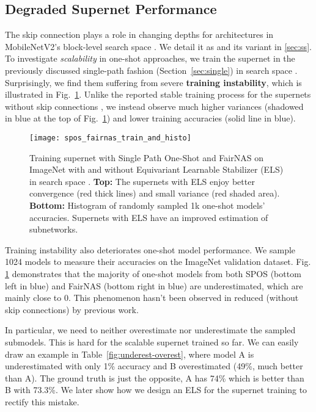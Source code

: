\documentclass[runningheads]{llncs}
\begin{document}
\subsection{Degraded Supernet Performance}


The skip connection plays a role in changing depths for architectures in MobileNetV2's block-level search space  \cite{cai2018proxylessnas,wu2018fbnet}. We detail it as  and its variant   in \ref{sec:ss}. To investigate \emph{scalability} in one-shot approaches, we train the supernet in the previously discussed single-path fashion (Section~\ref{sec:single}) in search space . Surprisingly, we find them suffering from severe \textbf{training instability}, which is illustrated in Fig.~\ref{fig:spos_fairnas_train_and_histo}. Unlike the reported stable training process for the supernets without skip connections \cite{guo2019single,chu2019fairnas}, we instead observe much higher variances (shadowed in blue at the top of Fig.~\ref{fig:spos_fairnas_train_and_histo}) and lower training accuracies (solid line in blue).  

\begin{figure}[ht]
	\centering
	\texttt{[image: spos\_fairnas\_train\_and\_histo]}
	\caption{Training supernet with Single Path One-Shot \protect\cite{guo2019single} and FairNAS \protect\cite{chu2019fairnas} on ImageNet with and without Equivariant Learnable Stabilizer (ELS) in search space . \textbf{Top:} The supernets with ELS enjoy better convergence (red thick lines) and small variance (red shaded area). \textbf{Bottom:} Histogram of randomly sampled 1k one-shot models'  accuracies. Supernets with ELS have an improved estimation of subnetworks.}
	\label{fig:spos_fairnas_train_and_histo}
\end{figure} 

Training instability also deteriorates one-shot model performance. We sample 1024 models to measure their accuracies on the ImageNet validation dataset. Fig. \ref{fig:spos_fairnas_train_and_histo} demonstrates that the majority of one-shot models from both SPOS (bottom left in blue)  and FairNAS (bottom right in blue) are underestimated, which are mainly close to 0. This phenomenon hasn't been observed in reduced  (without skip connections) by previous work.

In particular, we need to neither overestimate nor underestimate the sampled submodels. This is hard for the scalable supernet trained so far. We can easily draw an example in Table~\ref{fig:underest-overest}, where model A is underestimated with only 1\% accuracy and B overestimated (49\%, much better than A). The ground truth is just the opposite, A has 74\% which is better than B with 73.3\%. We later show how we design an ELS for the supernet training to rectify this mistake.
\end{document}
